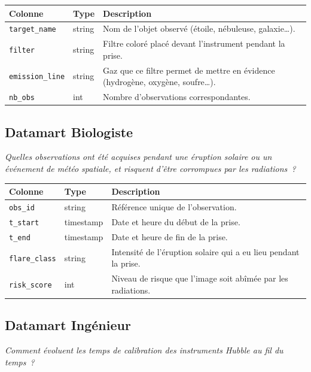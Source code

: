 \documentclass[11pt,a4paper]{article}
\begin{document}
\begin{tabularx}{\linewidth}{llX}
\toprule
\textbf{Colonne} & \textbf{Type} & \textbf{Description} \\
\midrule
\texttt{target\_name}   & string & Nom de l'objet observé (étoile, nébuleuse, galaxie\dots). \\
\texttt{filter}         & string & Filtre coloré placé devant l'instrument pendant la prise. \\
\texttt{emission\_line} & string & Gaz que ce filtre permet de mettre en évidence (hydrogène, oxygène, soufre\dots). \\
\texttt{nb\_obs}        & int    & Nombre d'observations correspondantes. \\
\bottomrule
\end{tabularx}

\subsection{Datamart Biologiste}

{\small\textit{Quelles observations ont été acquises pendant une éruption solaire ou un événement de météo spatiale, et risquent d'être corrompues par les radiations~?}}

\begin{tabularx}{\linewidth}{llX}
\toprule
\textbf{Colonne} & \textbf{Type} & \textbf{Description} \\
\midrule
\texttt{obs\_id}      & string    & Référence unique de l'observation. \\
\texttt{t\_start}     & timestamp & Date et heure du début de la prise. \\
\texttt{t\_end}       & timestamp & Date et heure de fin de la prise. \\
\texttt{flare\_class} & string    & Intensité de l'éruption solaire qui a eu lieu pendant la prise. \\
\texttt{risk\_score}  & int       & Niveau de risque que l'image soit abîmée par les radiations. \\
\bottomrule
\end{tabularx}

\subsection{Datamart Ingénieur}

{\small\textit{Comment évoluent les temps de calibration des instruments Hubble au fil du temps~?}}
\end{document}
